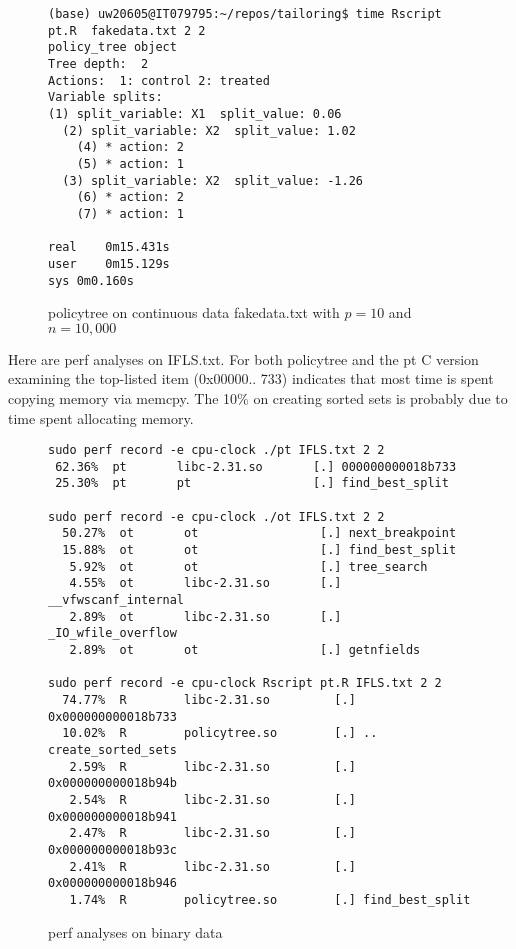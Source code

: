 \documentclass{article}
\begin{document}
\begin{figure}
  \centering
\begin{verbatim}
(base) uw20605@IT079795:~/repos/tailoring$ time Rscript pt.R  fakedata.txt 2 2 
policy_tree object 
Tree depth:  2 
Actions:  1: control 2: treated 
Variable splits: 
(1) split_variable: X1  split_value: 0.06 
  (2) split_variable: X2  split_value: 1.02 
    (4) * action: 2 
    (5) * action: 1 
  (3) split_variable: X2  split_value: -1.26 
    (6) * action: 2 
    (7) * action: 1 

real	0m15.431s
user	0m15.129s
sys	0m0.160s
\end{verbatim}
  \caption{policytree on continuous data fakedata.txt
    with $p=10$ and $n=10,000$}
\end{figure}

Here are perf analyses on IFLS.txt. For both policytree and the pt C
version examining the top-listed item (0x00000.. 733) indicates that
most time is spent copying memory via memcpy. The 10\% on creating
sorted sets is probably due to time spent allocating memory.

\begin{figure}
  \centering
\begin{verbatim}
sudo perf record -e cpu-clock ./pt IFLS.txt 2 2
 62.36%  pt       libc-2.31.so       [.] 000000000018b733
 25.30%  pt       pt                 [.] find_best_split       

sudo perf record -e cpu-clock ./ot IFLS.txt 2 2
  50.27%  ot       ot                 [.] next_breakpoint
  15.88%  ot       ot                 [.] find_best_split
   5.92%  ot       ot                 [.] tree_search
   4.55%  ot       libc-2.31.so       [.] __vfwscanf_internal
   2.89%  ot       libc-2.31.so       [.] _IO_wfile_overflow
   2.89%  ot       ot                 [.] getnfields

sudo perf record -e cpu-clock Rscript pt.R IFLS.txt 2 2 
  74.77%  R        libc-2.31.so         [.] 0x000000000018b733
  10.02%  R        policytree.so        [.] .. create_sorted_sets
   2.59%  R        libc-2.31.so         [.] 0x000000000018b94b
   2.54%  R        libc-2.31.so         [.] 0x000000000018b941
   2.47%  R        libc-2.31.so         [.] 0x000000000018b93c
   2.41%  R        libc-2.31.so         [.] 0x000000000018b946
   1.74%  R        policytree.so        [.] find_best_split
\end{verbatim}
  \caption{perf analyses on binary data}
  \label{fig:perfbinary}
\end{figure}
\end{document}
